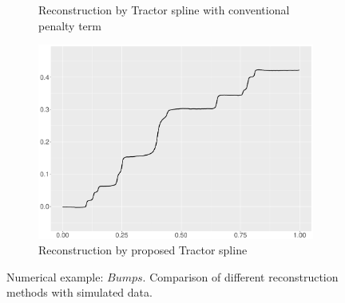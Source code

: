 \begin{figure}
\begin{subfigure}{0.45\textwidth}
    \caption{Reconstruction by Tractor spline with conventional penalty term}
    \end{subfigure}
    \begin{subfigure}{0.45\textwidth}
    \centering
    \includegraphics[width=\linewidth,height=0.45\textwidth]{Chapters/02TractorSplineTheory/plot/ggplot/ggBumpsTractor.pdf}
    \caption{Reconstruction by proposed Tractor spline}
    \end{subfigure}
\caption{Numerical example: $\textit{Bumps}$. Comparison of different reconstruction methods with simulated data.}\label{num2}
 \end{figure}






